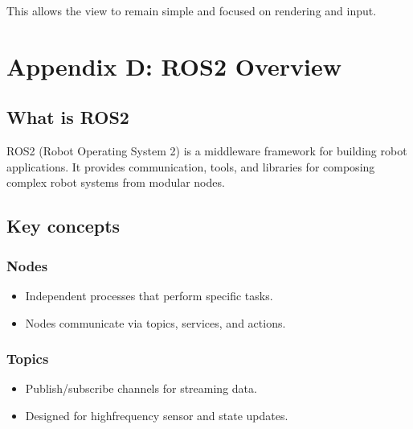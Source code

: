 \documentclass[letterpaper,10pt,english]{sphinxmanual}
\begin{document}
\sphinxAtStartPar
This allows the view to remain simple and focused on rendering and input.


\chapter{Appendix D: ROS2 Overview}
\label{\detokenize{appendix_d_ros2_overview:appendix-d-ros2-overview}}\label{\detokenize{appendix_d_ros2_overview::doc}}

\section{What is ROS2}
\label{\detokenize{appendix_d_ros2_overview:what-is-ros2}}
\sphinxAtStartPar
ROS2 (Robot Operating System 2) is a middleware framework for building robot
applications. It provides communication, tools, and libraries for composing
complex robot systems from modular nodes.


\section{Key concepts}
\label{\detokenize{appendix_d_ros2_overview:key-concepts}}

\subsection{Nodes}
\label{\detokenize{appendix_d_ros2_overview:nodes}}\begin{itemize}
\item {} 
\sphinxAtStartPar
Independent processes that perform specific tasks.

\item {} 
\sphinxAtStartPar
Nodes communicate via topics, services, and actions.

\end{itemize}


\subsection{Topics}
\label{\detokenize{appendix_d_ros2_overview:topics}}\begin{itemize}
\item {} 
\sphinxAtStartPar
Publish/subscribe channels for streaming data.

\item {} 
\sphinxAtStartPar
Designed for high\sphinxhyphen{}frequency sensor and state updates.

\end{itemize}
\end{document}
